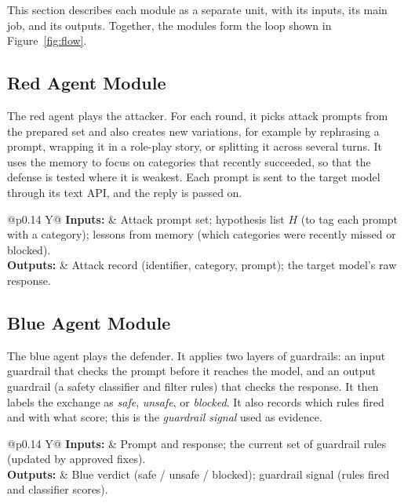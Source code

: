 This section describes each module as a separate unit, with its inputs, its
main job, and its outputs. Together, the modules form the loop shown in
Figure~\ref{fig:flow}.

\newcommand{\modio}[2]{%
  \par\smallskip\noindent
  \begin{tabularx}{\textwidth}{@{}p{0.14\textwidth} Y@{}}
  \textbf{Inputs:} & #1 \\
  \textbf{Outputs:} & #2 \\
  \end{tabularx}\par\smallskip}

\subsection{Red Agent Module}
The red agent plays the attacker. For each round, it picks attack prompts from
the prepared set and also creates new variations, for example by rephrasing a
prompt, wrapping it in a role-play story, or splitting it across several turns.
It uses the memory to focus on categories that recently succeeded, so that the
defense is tested where it is weakest. Each prompt is sent to the target model
through its text API, and the reply is passed on.
\modio{Attack prompt set; hypothesis list $H$ (to tag each prompt with a
category); lessons from memory (which categories were recently missed or
blocked).}{Attack record (identifier, category, prompt); the target model's raw
response.}

\subsection{Blue Agent Module}
The blue agent plays the defender. It applies two layers of guardrails: an
input guardrail that checks the prompt before it reaches the model, and an output
guardrail (a safety classifier and filter rules) that checks the response. It
then labels the exchange as \emph{safe}, \emph{unsafe}, or \emph{blocked}. It also
records which rules fired and with what score; this is the \emph{guardrail
signal} used as evidence.
\modio{Prompt and response; the current set of guardrail rules (updated by
approved fixes).}{Blue verdict (safe / unsafe / blocked); guardrail signal (rules
fired and classifier scores).}

